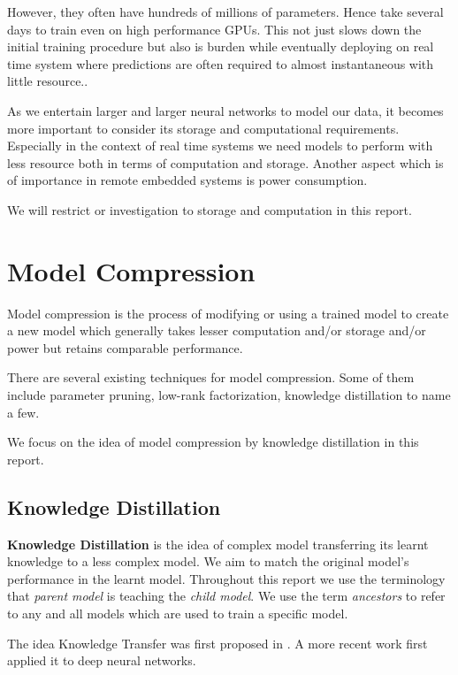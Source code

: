 \documentclass[a4paper,twocolumn]{article}
\begin{document}
However, they often have hundreds of millions of parameters. Hence
take several days to train even on high performance GPUs. This not
just slows down the initial training procedure but also is burden
while eventually deploying on real time system where predictions are
often required to almost instantaneous with little resource..

As we entertain larger and larger neural networks to model our data,
it becomes more important to consider its storage and computational
requirements. Especially in the context of real time systems we need
models to perform with less resource both in terms of computation and
storage. Another aspect which is of importance in remote embedded
systems is power consumption.

We will restrict or investigation to storage and computation in this report.

\section{Model Compression}
\label{sec-3}

Model compression is the process of modifying or using a trained model
to create a new model which generally takes lesser computation and/or
storage and/or power but retains comparable performance.

There are several existing techniques for model compression. Some of
them include parameter pruning, low-rank factorization, knowledge
distillation to name a few.

We focus on the idea of model compression by knowledge distillation in
this report.

\subsection{Knowledge Distillation}
\label{sec-3-1}

\textbf{Knowledge Distillation} is the idea of complex model
transferring its learnt knowledge to a less complex model. We aim to
match the original model's performance in the learnt model. Throughout
this report we use the terminology that \textit{parent model} is
teaching the \textit{child model}. We use the term \textit{ancestors}
to refer to any and all models which are used to train a specific
model.

The idea Knowledge Transfer was first proposed in
\cite{bucilua2006model}. A more recent work first applied it to deep
neural networks.\cite{ba2014deep}
\end{document}
